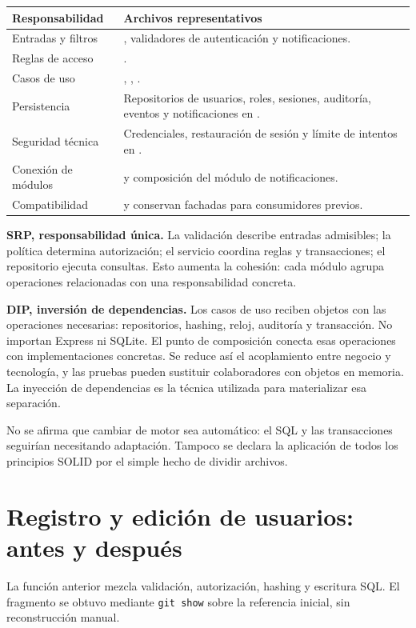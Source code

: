 \begingroup\setlength{\parskip}{0pt}
\begin{longtable}{P{0.27\textwidth}P{0.65\textwidth}}
\toprule Responsabilidad & Archivos representativos \\ \midrule\endhead
Entradas y filtros & , validadores de autenticación y notificaciones. \\
Reglas de acceso & . \\
Casos de uso & , , . \\
Persistencia & Repositorios de usuarios, roles, sesiones, auditoría, eventos y notificaciones en . \\
Seguridad técnica & Credenciales, restauración de sesión y límite de intentos en . \\
Conexión de módulos &  y composición del módulo de notificaciones. \\
Compatibilidad &  y  conservan fachadas para consumidores previos. \\
\bottomrule
\end{longtable}\endgroup

\textbf{SRP, responsabilidad única.} La validación describe entradas admisibles;
la política determina autorización; el servicio coordina reglas y transacciones;
el repositorio ejecuta consultas. Esto aumenta la cohesión: cada módulo agrupa
operaciones relacionadas con una responsabilidad concreta.

\textbf{DIP, inversión de dependencias.} Los casos de uso reciben objetos con las
operaciones necesarias: repositorios, hashing, reloj, auditoría y transacción.
No importan Express ni SQLite. El punto de composición conecta esas operaciones
con implementaciones concretas. Se reduce así el acoplamiento entre negocio y
tecnología, y las pruebas pueden sustituir colaboradores con objetos en memoria.
La inyección de dependencias es la técnica utilizada para materializar esa separación.

No se afirma que cambiar de motor sea automático: el SQL y las transacciones
seguirían necesitando adaptación. Tampoco se declara la aplicación de todos los
principios SOLID por el simple hecho de dividir archivos.

\section{Registro y edición de usuarios: antes y después}
La función anterior mezcla validación, autorización, hashing y escritura SQL. El
fragmento se obtuvo mediante \texttt{git show} sobre la referencia inicial, sin
reconstrucción manual.

